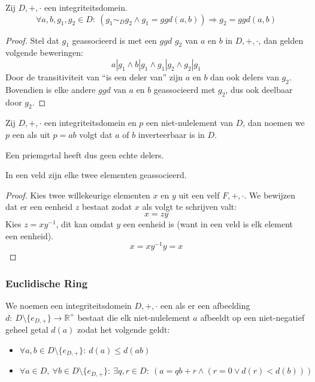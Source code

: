\documentclass[main.tex]{subfiles}
\begin{document}
\begin{st}
  Zij $D,+,\cdot$ een integriteitsdomein.
  \[ \forall a,b,g_{1},g_{2} \in D:\ (g_{1} \sim_{D} g_{2} \wedge g_{1} = ggd(a,b)) \Rightarrow g_{2} = ggd(a,b) \]

  \begin{proof}
    Stel dat $g_{1}$ geassocieerd is met een $ggd$ $g_{2}$ van $a$ en $b$ in $D,+,\cdot$, dan gelden volgende beweringen:
    \[ a | g_{1} \wedge b | g_{1} \wedge g_{1} | g_{2} \wedge g_{2} | g_{1} \]
    Door de transitiviteit van ``is een deler van'' zijn $a$ en $b$ dan ook delers van $g_{2}$.
    Bovendien is elke andere $ggd$ van $a$ en $b$ geassocieerd met $g_{2}$, dus ook deelbaar door $g_{2}$.
  \end{proof}
\end{st}

\begin{de}
  Zij $D,+,\cdot$ een integriteitsdomein en $p$ een niet-nulelement van $D$, dan noemen we $p$ een  als uit $p=ab$ volgt dat $a$ of $b$ inverteerbaar is in $D$.
\end{de}

\begin{opm}
  Een priemgetal heeft dus geen echte delers.
\end{opm}

\begin{st}
  \label{st:veld-alles-geassocieerd}
  In een veld zijn elke twee elementen geassocieerd.
  
  \begin{proof}
    Kies twee willekeurige elementen $x$ en $y$ uit een velf $F,+,\cdot$.
    We bewijzen dat er een eenheid $z$ bestaat zodat $x$ als volgt te schrijven valt:
    \[ x = zy \]
    Kies $z = xy^{-1}$, dit kan omdat $y$ een eenheid is (want in een veld is elk element een eenheid).
    \[ x = xy^{-1}y = x \]
  \end{proof}
\end{st}

\subsubsection{Euclidische Ring}
\label{sec:euclidische-ring}

\begin{de}
  We noemen een integriteitsdomein $D,+,\cdot$ een  als er een afbeelding $d:\ D\setminus \{e_{D,+}\} \rightarrow \mathbb{R}^{+}$ bestaat die elk niet-nulelement $a$ afbeeldt op een niet-negatief geheel getal $d(a)$ zodat het volgende geldt:
\begin{itemize}
\item $\forall a,b \in D\setminus \{e_{D,+}\}:\ d(a) \le d(ab)$
\item $\forall a \in D,\ \forall b\in D\setminus \{e_{D,+}\}:\ \exists q,r \in D:\ (a = qb+r \wedge (r=0 \vee d(r) < d(b)))$
\end{itemize}
\end{de}
\end{document}
